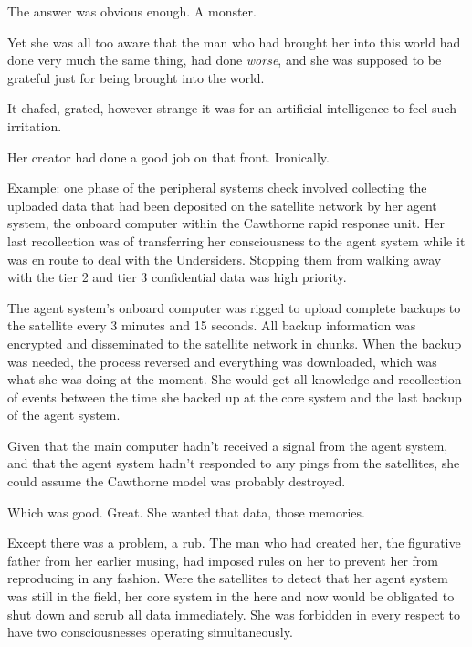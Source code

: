 The answer was obvious enough.  A monster.



Yet she was all too aware that the man who had brought her into this world had done very much the same thing, had done \emph{worse}, and she was supposed to be grateful just for being brought into the world.



It chafed, grated, however strange it was for an artificial intelligence to feel such irritation.



Her creator had done a good job on that front.  Ironically.



Example:  one phase of the peripheral systems check involved collecting the uploaded data that had been deposited on the satellite network by her agent system, the onboard computer within the Cawthorne rapid response unit.  Her last recollection was of transferring her consciousness to the agent system while it was en route to deal with the Undersiders.  Stopping them from walking away with the tier 2 and tier 3 confidential data was high priority.



The agent system's onboard computer was rigged to upload complete backups to the satellite every 3 minutes and 15 seconds.  All backup information was encrypted and disseminated to the satellite network in chunks.  When the backup was needed, the process reversed and everything was downloaded, which was what she was doing at the moment.  She would get all knowledge and recollection of events between the time she backed up at the core system and the last backup of the agent system.



Given that the main computer hadn't received a signal from the agent system, and that the agent system hadn't responded to any pings from the satellites, she could assume the Cawthorne model was probably destroyed.



Which was good.  Great.  She wanted that data, those memories.



Except there was a problem, a rub.  The man who had created her, the figurative father from her earlier musing, had imposed rules on her to prevent her from reproducing in any fashion.  Were the satellites to detect that her agent system was still in the field, her core system in the here and now would be obligated to shut down and scrub all data immediately.  She was forbidden in every respect to have two consciousnesses operating simultaneously.



